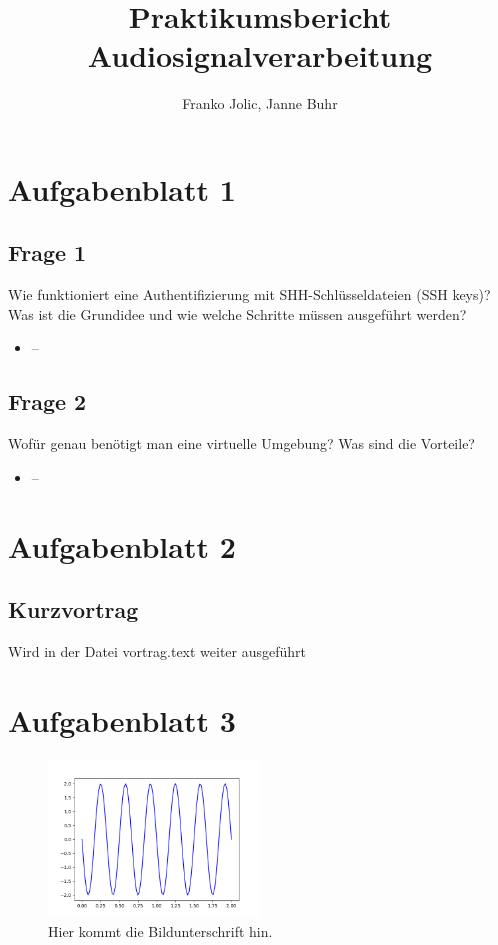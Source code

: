 \documentclass[a4paper, 11pt]{article}
\title{Praktikumsbericht Audiosignalverarbeitung}
\author{Franko Jolic, Janne Buhr}
\begin{document}
\begin{titlepage}
    \maketitle
    \tableofcontents
    \vfill
\end{titlepage}

\section{Aufgabenblatt 1}

    \subsection{Frage 1}
    Wie funktioniert eine Authentifizierung mit SHH-Schlüsseldateien (SSH keys)? Was ist die Grundidee und wie welche Schritte müssen ausgeführt werden?
    \begin{itemize}
    \item -- 
    \end{itemize}
    
    \subsection{Frage 2}
    Wofür genau benötigt man eine virtuelle Umgebung? Was sind die Vorteile?
    \begin{itemize}
    \item -- 
    \end{itemize}
        

\section{Aufgabenblatt 2}

    \subsection{Kurzvortrag}
    Wird in der Datei vortrag.text weiter ausgeführt

\section{Aufgabenblatt 3}

    
    
    \begin{figure}
    \includegraphics[width =0.5\textwidth]{plot.png}
    \caption{Hier kommt die Bildunterschrift hin.}
    \label{fig : label1}
    \end{figure}
\end{document}
